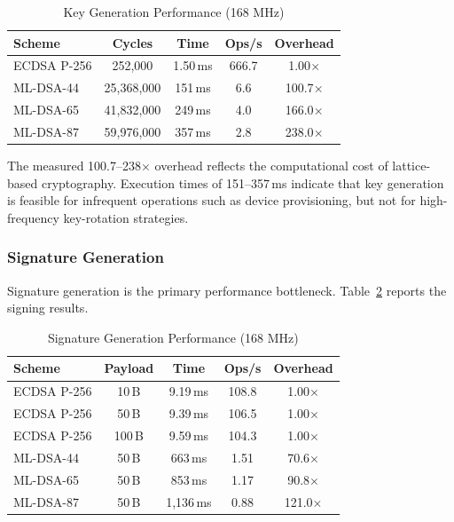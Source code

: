 \documentclass[final, twoside]{IEEEtran} %
\begin{document}
\begin{table}[h]
	\centering
	\caption{Key Generation Performance (168 MHz)}
	\label{tab:keygen-performance}
	\begin{tabular}{lcccc}
		\toprule
		\textbf{Scheme} & \textbf{Cycles} & \textbf{Time} & \textbf{Ops/s} & \textbf{Overhead} \\
		\midrule
		ECDSA P-256     & 252,000         & 1.50\,ms      & 666.7          & 1.00$\times$      \\
		ML-DSA-44       & 25,368,000      & 151\,ms       & 6.6            & 100.7$\times$     \\
		ML-DSA-65       & 41,832,000      & 249\,ms       & 4.0            & 166.0$\times$     \\
		ML-DSA-87       & 59,976,000      & 357\,ms       & 2.8            & 238.0$\times$     \\
		\bottomrule
	\end{tabular}
\end{table}

The measured 100.7--238$\times$ overhead reflects the computational cost of lattice-based cryptography. Execution times of 151--357\,ms indicate that key generation is feasible for infrequent operations such as device provisioning, but not for high-frequency key-rotation strategies.

\subsubsection{Signature Generation}

Signature generation is the primary performance bottleneck. Table~\ref{tab:sign-performance} reports the signing results.

\begin{table}[h]
	\centering
	\caption{Signature Generation Performance (168 MHz)}
	\label{tab:sign-performance}
	\begin{tabular}{lcccc}
		\toprule
		\textbf{Scheme} & \textbf{Payload} & \textbf{Time} & \textbf{Ops/s} & \textbf{Overhead} \\
		\midrule
		ECDSA P-256     & 10\,B            & 9.19\,ms      & 108.8          & 1.00$\times$      \\
		ECDSA P-256     & 50\,B            & 9.39\,ms      & 106.5          & 1.00$\times$      \\
		ECDSA P-256     & 100\,B           & 9.59\,ms      & 104.3          & 1.00$\times$      \\
		\midrule
		ML-DSA-44       & 50\,B            & 663\,ms       & 1.51           & 70.6$\times$      \\
		ML-DSA-65       & 50\,B            & 853\,ms       & 1.17           & 90.8$\times$      \\
		ML-DSA-87       & 50\,B            & 1,136\,ms     & 0.88           & 121.0$\times$     \\
		\bottomrule
	\end{tabular}
\end{table}
\end{document}
